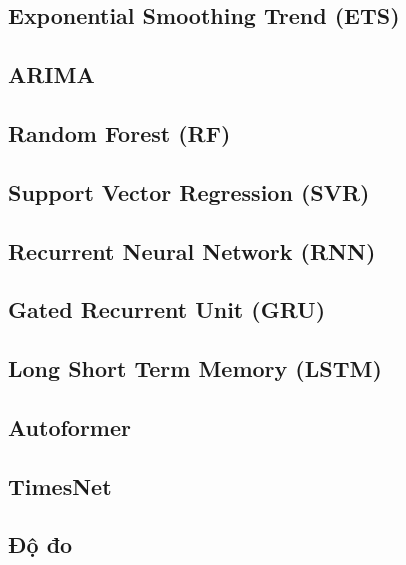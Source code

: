 \documentclass[conference]{IEEEtran}
\begin{document}
\subsection{Exponential Smoothing Trend (ETS)}


\subsection{ARIMA}


\subsection{Random Forest (RF)}


\subsection{Support Vector Regression (SVR)}


\subsection{Recurrent Neural Network (RNN)}


\subsection{Gated Recurrent Unit (GRU)}


\subsection{Long Short Term Memory (LSTM)}


\subsection{Autoformer}


\subsection{TimesNet}


\subsection{Độ đo}

\end{document}
